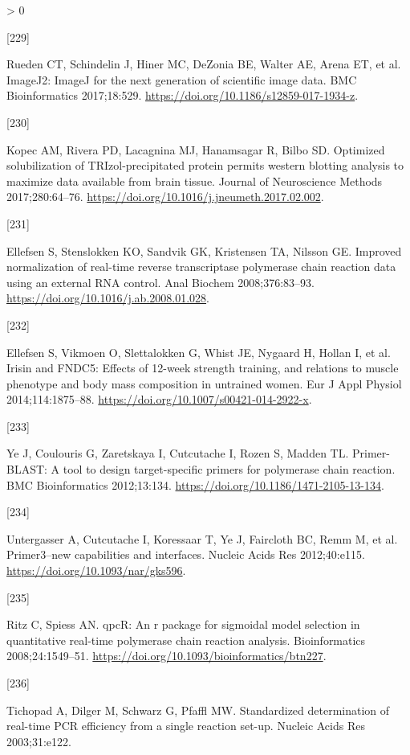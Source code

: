 \documentclass[twoside,10pt]{gihclass} %
\newlength{\cslhangindent}
\newlength{\csllabelwidth}
\newenvironment{CSLReferences}[3] %
 {%
  \setlength{\parindent}{0pt}
  \ifodd #1 \everypar{\setlength{\hangindent}{\cslhangindent}}\ignorespaces\fi
  \ifnum #2 > 0
  \setlength{\parskip}{#2\baselineskip}
  \fi
 }%
 {}
\newcommand{\CSLLeftMargin}[1]{\parbox[t]{\maxof{\widthof{#1}}{\csllabelwidth}}{#1}}
\newcommand{\CSLRightInline}[1]{\parbox[t]{\linewidth}{#1}}
\begin{document}
\begin{CSLReferences}{0}{0}
\leavevmode\hypertarget{ref-RN2259}{}%
\CSLLeftMargin{{[}229{]} }
\CSLRightInline{Rueden CT, Schindelin J, Hiner MC, DeZonia BE, Walter AE, Arena ET, et al. ImageJ2: ImageJ for the next generation of scientific image data. BMC Bioinformatics 2017;18:529. \url{https://doi.org/10.1186/s12859-017-1934-z}.}

\leavevmode\hypertarget{ref-RN2050}{}%
\CSLLeftMargin{{[}230{]} }
\CSLRightInline{Kopec AM, Rivera PD, Lacagnina MJ, Hanamsagar R, Bilbo SD. Optimized solubilization of TRIzol-precipitated protein permits western blotting analysis to maximize data available from brain tissue. Journal of Neuroscience Methods 2017;280:64--76. \url{https://doi.org/10.1016/j.jneumeth.2017.02.002}.}

\leavevmode\hypertarget{ref-RN1162}{}%
\CSLLeftMargin{{[}231{]} }
\CSLRightInline{Ellefsen S, Stenslokken KO, Sandvik GK, Kristensen TA, Nilsson GE. Improved normalization of real-time reverse transcriptase polymerase chain reaction data using an external RNA control. Anal Biochem 2008;376:83--93. \url{https://doi.org/10.1016/j.ab.2008.01.028}.}

\leavevmode\hypertarget{ref-RN1512}{}%
\CSLLeftMargin{{[}232{]} }
\CSLRightInline{Ellefsen S, Vikmoen O, Slettalokken G, Whist JE, Nygaard H, Hollan I, et al. Irisin and FNDC5: Effects of 12-week strength training, and relations to muscle phenotype and body mass composition in untrained women. Eur J Appl Physiol 2014;114:1875--88. \url{https://doi.org/10.1007/s00421-014-2922-x}.}

\leavevmode\hypertarget{ref-RN1815}{}%
\CSLLeftMargin{{[}233{]} }
\CSLRightInline{Ye J, Coulouris G, Zaretskaya I, Cutcutache I, Rozen S, Madden TL. Primer-BLAST: A tool to design target-specific primers for polymerase chain reaction. BMC Bioinformatics 2012;13:134. \url{https://doi.org/10.1186/1471-2105-13-134}.}

\leavevmode\hypertarget{ref-RN1816}{}%
\CSLLeftMargin{{[}234{]} }
\CSLRightInline{Untergasser A, Cutcutache I, Koressaar T, Ye J, Faircloth BC, Remm M, et al. Primer3--new capabilities and interfaces. Nucleic Acids Res 2012;40:e115. \url{https://doi.org/10.1093/nar/gks596}.}

\leavevmode\hypertarget{ref-RN1768}{}%
\CSLLeftMargin{{[}235{]} }
\CSLRightInline{Ritz C, Spiess AN. qpcR: An r package for sigmoidal model selection in quantitative real-time polymerase chain reaction analysis. Bioinformatics 2008;24:1549--51. \url{https://doi.org/10.1093/bioinformatics/btn227}.}

\leavevmode\hypertarget{ref-RN1934}{}%
\CSLLeftMargin{{[}236{]} }
\CSLRightInline{Tichopad A, Dilger M, Schwarz G, Pfaffl MW. Standardized determination of real-time PCR efficiency from a single reaction set-up. Nucleic Acids Res 2003;31:e122.}


\end{CSLReferences}
\end{document}
